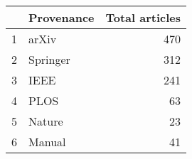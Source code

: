 \begin{tabular}{llr}
\toprule
{} & Provenance & Total articles  \\
\midrule
1 & arXiv      &                 470 \\
2 & Springer   &                 312 \\
3 & IEEE       &                 241 \\
4 & PLOS       &                  63 \\
5 & Nature     &                  23 \\
6 & Manual     &                  41 \\
\bottomrule
\end{tabular}
